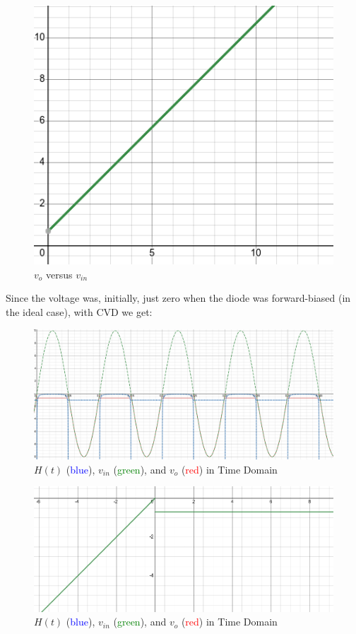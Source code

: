 \begin{enumerate}
\begin{enumerate}
            \begin{figure}[H]
              \centering
              \includegraphics[width=.7\textwidth]{Figures/HW4-1c2}
              \caption{$v_o$ versus $v_{in}$}
              \label{fig:6}
            \end{figure}

            Since the voltage was, initially, just zero when the diode was forward-biased (in the ideal case), with CVD we get:

            \begin{figure}[H]
              \centering
              \includegraphics[width=.9\textwidth]{Figures/HW4-1c3}
              \caption{$H(t)$ (\textcolor{blue}{blue}), $v_{in}$ (\textcolor{green}{green}), and $v_{o}$ (\textcolor{red}{red}) in Time Domain}
              \label{fig:7}
            \end{figure}

            \begin{figure}[H]
              \centering
              \includegraphics[width=.9\textwidth]{Figures/HW4-1c4}
              \caption{$H(t)$ (\textcolor{blue}{blue}), $v_{in}$ (\textcolor{green}{green}), and $v_{o}$ (\textcolor{red}{red}) in Time Domain}
              \label{fig:8}
            \end{figure}


\end{enumerate}
\end{enumerate}
